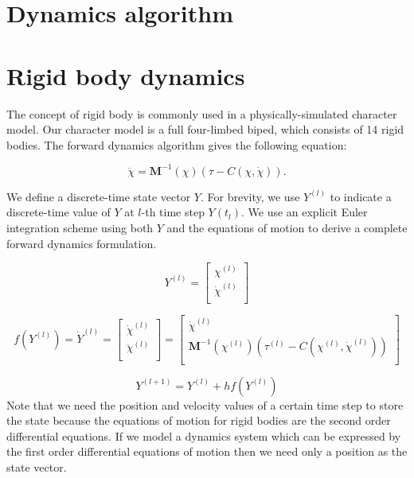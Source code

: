 \documentclass[master,english,final]{kaist-ucs}
\begin{document}
\pagebreak

\section{Dynamics algorithm}

\section{Rigid body dynamics}

The concept of rigid body is commonly used in a physically-simulated
character model.
Our character model is a full four-limbed biped, which consists of 14 rigid bodies.
The forward dynamics algorithm gives the following equation:

\begin{equation}
\ddot\chi =\mathbf{M}^{-1}(\chi) ( \tau - C(\chi,\dot\chi) ).
\end{equation}

We define a discrete-time state vector $Y$. For brevity, we use $Y^{(l)}$
to indicate a discrete-time value of $Y$ at $l$-th time step $Y(t_l)$.
We use an explicit Euler integration
scheme using both $Y$ and the equations of motion to derive a complete
forward dynamics formulation.

\begin{equation}
Y^{(l)} =
\left[ {\begin{array}{cc}
 \chi^{(l)}   \\
 \dot\chi^{(l)}   \\
 \end{array} } \right]
\end{equation}

\begin{equation}
f(Y^{(l)})=\dot{Y}^{(l)}
=
\left[ {\begin{array}{cc}
 \dot\chi^{(l)}   \\
 \ddot\chi^{(l)}   \\
 \end{array} } \right]
 =
\left[ {\begin{array}{cc}
 \dot\chi^{(l)}   \\
 \mathbf{M}^{-1}(\chi^{(l)}) ( \tau^{(l)} - C(\chi^{(l)},\dot\chi^{(l)}) )   \\
 \end{array} } \right]
\end{equation}

\begin{equation}
Y^{(l+1)}=Y^{(l)}+hf(Y^{(l)})
\end{equation}
Note that we need the position and velocity values of a certain time step
to store the state because the equations of motion for rigid bodies
are the second order differential equations.
If we model a dynamics system
which can be expressed by the first order differential equations of motion
then we need only a position as the state vector.
\end{document}
